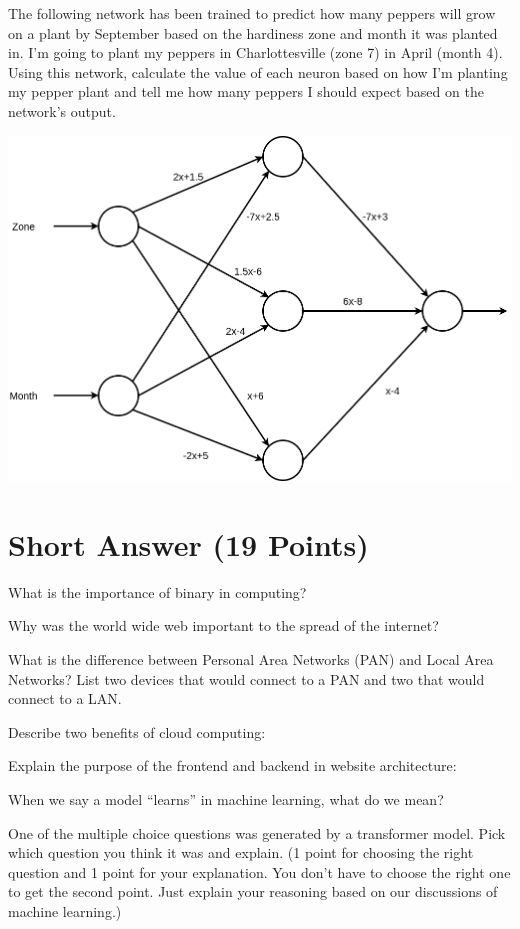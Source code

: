 \documentclass{exam}
\begin{document}
\begin{questions}
\newpage
\question[5] The following network has been trained to predict how many peppers will grow on a plant by September based on the hardiness zone and month it was planted in. I'm going to plant my peppers in Charlottesville (zone 7) in April (month 4). Using this network, calculate the value of each neuron based on how I'm planting my pepper plant and tell me how many peppers I should expect based on the network's output.

\includegraphics[width=\linewidth]{network.png}

\newpage

\section{Short Answer (19 Points)}
\question[3] What is the importance of binary in computing?
\vspace{2in}

\question[3] Why was the world wide web important to the spread of the internet?
\vspace{2in}

\question[4] What is the difference between Personal Area Networks (PAN) and Local Area Networks? List two devices that would connect to a PAN and two that would connect to a LAN.
\vspace{2in}

\question[3] Describe two benefits of cloud computing:
\newpage

\question[3] Explain the purpose of the frontend and backend in website architecture:
\vspace{2in}

\question[3] When we say a model ``learns'' in machine learning, what do we mean?
\vspace{2in}


\bonusquestion[2] One of the multiple choice questions was generated by a transformer model. Pick which question you think it was and explain. (1 point for choosing the right question and 1 point for your explanation. You don't have to choose the right one to get the second point. Just explain your reasoning based on our discussions of machine learning.)
\end{questions}
\end{document}
